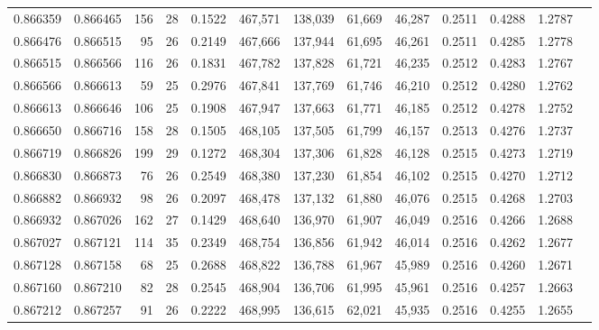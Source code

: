 \begin{tabular}{rrrrrrrrrrrrr}
0.866359 & 0.866465 &   156 &  28 &                                     0.1522 & 467,571 & 138,039 &  61,669 &  46,287 & 0.2511 & 0.4288 & 1.2787 \\
0.866476 & 0.866515 &    95 &  26 &                                     0.2149 & 467,666 & 137,944 &  61,695 &  46,261 & 0.2511 & 0.4285 & 1.2778 \\
0.866515 & 0.866566 &   116 &  26 &                                     0.1831 & 467,782 & 137,828 &  61,721 &  46,235 & 0.2512 & 0.4283 & 1.2767 \\
0.866566 & 0.866613 &    59 &  25 &                                     0.2976 & 467,841 & 137,769 &  61,746 &  46,210 & 0.2512 & 0.4280 & 1.2762 \\
0.866613 & 0.866646 &   106 &  25 &                                     0.1908 & 467,947 & 137,663 &  61,771 &  46,185 & 0.2512 & 0.4278 & 1.2752 \\
0.866650 & 0.866716 &   158 &  28 &                                     0.1505 & 468,105 & 137,505 &  61,799 &  46,157 & 0.2513 & 0.4276 & 1.2737 \\
0.866719 & 0.866826 &   199 &  29 &                                     0.1272 & 468,304 & 137,306 &  61,828 &  46,128 & 0.2515 & 0.4273 & 1.2719 \\
0.866830 & 0.866873 &    76 &  26 &                                     0.2549 & 468,380 & 137,230 &  61,854 &  46,102 & 0.2515 & 0.4270 & 1.2712 \\
0.866882 & 0.866932 &    98 &  26 &                                     0.2097 & 468,478 & 137,132 &  61,880 &  46,076 & 0.2515 & 0.4268 & 1.2703 \\
0.866932 & 0.867026 &   162 &  27 &                                     0.1429 & 468,640 & 136,970 &  61,907 &  46,049 & 0.2516 & 0.4266 & 1.2688 \\
0.867027 & 0.867121 &   114 &  35 &                                     0.2349 & 468,754 & 136,856 &  61,942 &  46,014 & 0.2516 & 0.4262 & 1.2677 \\
0.867128 & 0.867158 &    68 &  25 &                                     0.2688 & 468,822 & 136,788 &  61,967 &  45,989 & 0.2516 & 0.4260 & 1.2671 \\
0.867160 & 0.867210 &    82 &  28 &                                     0.2545 & 468,904 & 136,706 &  61,995 &  45,961 & 0.2516 & 0.4257 & 1.2663 \\
0.867212 & 0.867257 &    91 &  26 &                                     0.2222 & 468,995 & 136,615 &  62,021 &  45,935 & 0.2516 & 0.4255 & 1.2655 \\

\end{tabular}
